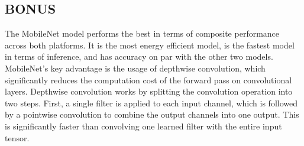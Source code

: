 \documentclass{article}
\begin{document}
\subsection*{BONUS}
The MobileNet model performs the best in terms of composite performance across both platforms.
It is the most energy efficient model, is the fastest model in terms of inference, and has 
accuracy on par with the other two models.
MobileNet's key advantage is the usage of depthwise convolution, which significantly reduces the computation cost of the forward pass on convolutional layers.
Depthwise convolution works by splitting the convolution operation into two steps. First, a single filter is applied to each input channel, which is followed by a pointwise convolution to combine the output channels into one output.
This is significantly faster than convolving one learned filter with the entire input tensor. 
\end{document}
